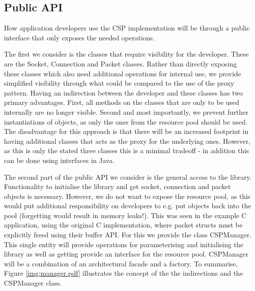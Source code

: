\subsection{Public API}
How application developers use the CSP implementation will be through a public interface that only exposes the needed operations. 

The first we consider is the classes that require visibility for the developer. These are the Socket, Connection and Packet classes. Rather than directly exposing these classes which also need additional operations for internal use, we provide simplified visibility through what could be compared to the use of the proxy pattern\cite{Gamma:1995:DPE:186897}. Having an indirection between the developer and these classes has two primary advantages. First, all methods on the classes that are only to be used internally are no longer visible. Second and most importantly, we prevent further instantiations of objects, as only the ones from the resource pool should be used. The disadvantage for this approach is that there will be an increased footprint in having additional classes that acts as the proxy for the underlying ones. However, as this is only the stated three classes this is a minimal tradeoff - in addition this can be done using interfaces in Java.

The second part of the public API we consider is the general access to the library. Functionality to initialise the library and get socket, connection and packet objects is necessary. However, we do not want to expose the resource pool, as this would put additional responsibility on developers to e.g. put objects back into the pool (forgetting would result in memory leaks!). This was seen in the example C application, using the original C implementation, where packet structs must be explicitly freed using their buffer API. For this we provide the class CSPManager. This single entity will provide operations for parameterising and initialising the library as well as getting provide an interface for the resource pool. CSPManager will be a combination of an architectural facade and a factory\cite{Gamma:1995:DPE:186897}. To summarise, Figure \ref{img:manager.pdf} illustrates the concept of the the indirections and the CSPManager class.
